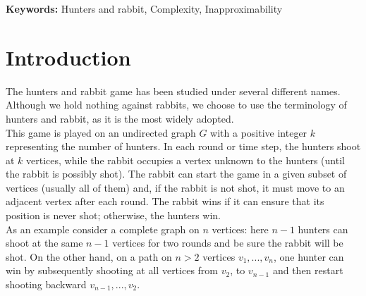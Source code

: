 \documentclass[runningheads]{llncs}
\begin{document}
{\bf{Keywords:}}
Hunters and rabbit, Complexity, Inapproximability


\section{Introduction}

The hunters and rabbit game has been studied under several different names. Although we hold nothing against rabbits, we choose to use the terminology of hunters and rabbit, as it is the most widely adopted. \\
This game is played on an undirected graph $G$ with a positive integer $k$ representing the number of hunters. In each round or time step, the hunters shoot at $k$ vertices, while the rabbit occupies a vertex unknown to the hunters (until the rabbit is possibly shot). The rabbit can start the game in a given subset of vertices (usually all of them) and, if the rabbit is not shot, it must move to an adjacent vertex after each round. The rabbit wins if it can ensure that its position is never shot; otherwise, the hunters win.\\
As an example consider a complete graph on $n$ vertices: here $n-1$ hunters can shoot at the same $n-1$ vertices for two rounds and be sure the rabbit will be shot. On the other hand, on a path on $n>2$ vertices $v_1,...,v_n$, one hunter can win by
 subsequently shooting at all vertices from $v_2$, to $v_{n-1}$ and then restart shooting backward $v_{n-1},...,v_2$. 
\end{document}

